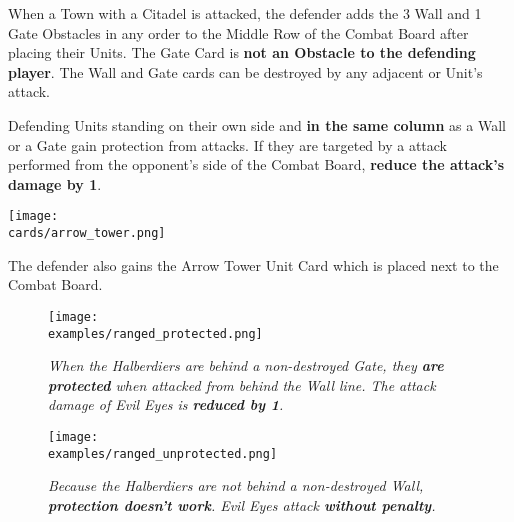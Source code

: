 \begin{multicols}{2}
When a Town with a Citadel is attacked, the defender adds the 3 Wall and 1 Gate Obstacles in any order to the Middle Row of the Combat Board after placing their Units.
The Gate Card is \textbf{not an Obstacle to the defending player}.
The Wall and Gate cards can be destroyed by any adjacent  or  Unit's attack.
\par
Defending Units standing on their own side and \textbf{in the same column} as a Wall or a Gate gain protection from  attacks.
If they are targeted by a  attack performed from the opponent's side of the Combat Board, \textbf{reduce the attack's damage by 1}.

\begin{center}
  \texttt{[image: \\cards/arrow\_tower.png]}
\end{center}
The defender also gains the Arrow Tower Unit Card which is placed next to the Combat Board.

\end{multicols}

\vspace*{\fill}
\begin{figure*}[h]
  \mbox{}%
  \hfill%
  \begin{minipage}[t]{0.415\textwidth}
    \centering
    \texttt{[image: \\examples/ranged\_protected.png]}
  \caption[halberdiers protected]{\textit{When the Halberdiers are behind a non-destroyed Gate, they \textbf{are protected} when attacked from behind the Wall line.
    The  attack damage of Evil Eyes is \textbf{reduced by 1}.}}
  \end{minipage}
  \hfill%
  \begin{minipage}[t]{0.415\textwidth}
    \centering
    \texttt{[image: \\examples/ranged\_unprotected.png]}
    \caption[halberdiers unprotected]{\textit{Because the Halberdiers are not behind a non-destroyed Wall, \textbf{protection doesn't work}.
      Evil Eyes attack \textbf{without penalty}.}}
  \end{minipage}
  \hfill%
  \mbox{}%
\end{figure*}

